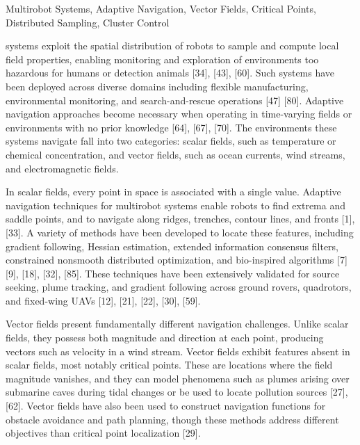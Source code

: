 \documentclass[lettersize,journal]{IEEEtran}
\begin{document}
\begin{IEEEkeywords}
Multirobot Systems, Adaptive Navigation, Vector Fields, Critical Points, Distributed Sampling, Cluster Control
\end{IEEEkeywords}

 systems exploit the spatial distribution of robots to sample and compute local field properties, enabling monitoring and exploration of environments too hazardous for humans or detection animals [34], [43], [60]. Such systems have been deployed across diverse domains including flexible manufacturing, environmental monitoring, and search-and-rescue operations [47] [80]. Adaptive navigation approaches become necessary when operating in time-varying fields or environments with no prior knowledge [64], [67], [70]. The environments these systems navigate fall into two categories: scalar fields, such as temperature or chemical concentration, and vector fields, such as ocean currents, wind streams, and electromagnetic fields.

In scalar fields, every point in space is associated with a single value. Adaptive navigation techniques for multirobot systems enable robots to find extrema and saddle points, and to navigate along ridges, trenches, contour lines, and fronts [1], [33]. A variety of methods have been developed to locate these features, including gradient following, Hessian estimation, extended information consensus filters, constrained nonsmooth distributed optimization, and bio-inspired algorithms [7] [9], [18], [32], [85]. These techniques have been extensively validated for source seeking, plume tracking, and gradient following across ground rovers, quadrotors, and fixed-wing UAVs  [12], [21], [22], [30], [59].

Vector fields present fundamentally different navigation challenges. Unlike scalar fields, they possess both magnitude and direction at each point, producing vectors such as velocity in a wind stream. Vector fields exhibit features absent in scalar fields, most notably critical points. These are locations where the field magnitude vanishes, and they can model phenomena such as plumes arising over submarine caves during tidal changes or be used to locate pollution sources [27], [62]. Vector fields have also been used to construct navigation functions for obstacle avoidance and path planning, though these methods address different objectives than critical point localization [29]. 
\end{document}
